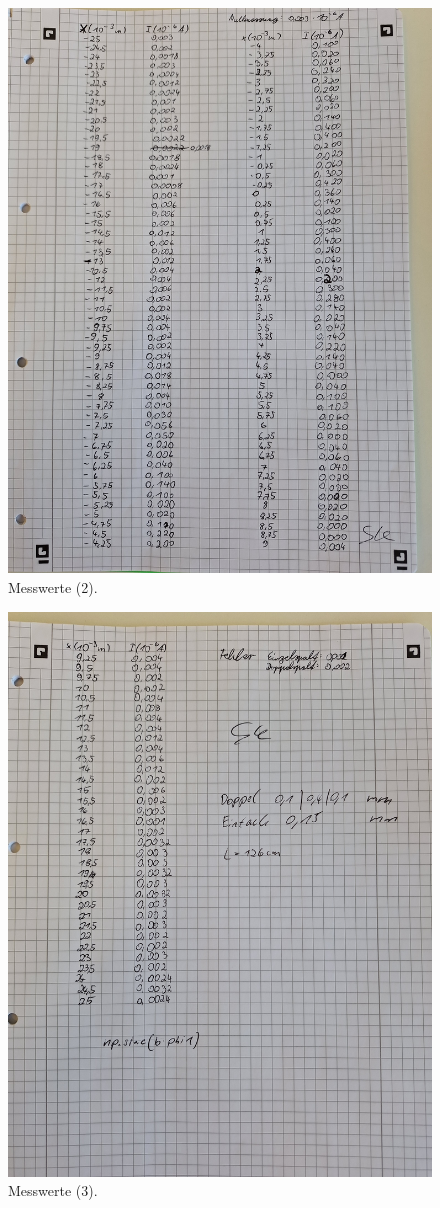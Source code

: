 \begin{figure}
    \caption{Messwerte (2).}
    \centering
    \includegraphics[width=\textwidth, angle=-90]{"Bilder/mw2.jpg"}
\end{figure}
\begin{figure}
    \caption{Messwerte (3).}
    \centering
    \includegraphics[width=\textwidth,angle=-90]{"Bilder/mw3.jpg"}
\end{figure}
